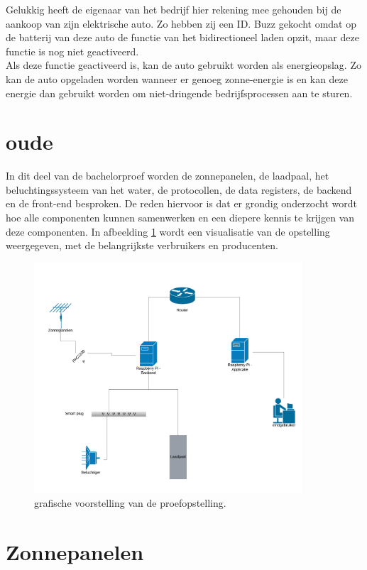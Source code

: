 Gelukkig heeft de eigenaar van het bedrijf hier rekening mee gehouden bij de aankoop van zijn elektrische auto. Zo hebben zij een ID. Buzz gekocht omdat op de batterij van deze auto de functie van het bidirectioneel laden opzit, maar deze functie is nog niet geactiveerd.\\

Als deze functie geactiveerd is, kan de auto gebruikt worden als energieopslag. Zo kan de auto opgeladen worden wanneer er genoeg zonne-energie is en kan deze energie dan gebruikt worden om niet-dringende bedrijfsprocessen aan te sturen.

\section{oude}
\label{sec:stand-van-zaken-oude}

In dit deel van de bachelorproef worden de zonnepanelen, de laadpaal, het beluchtingssysteem van het water, de protocollen, de data registers, de backend en de front-end besproken. De reden hiervoor is dat er grondig onderzocht wordt hoe alle componenten kunnen samenwerken en een diepere kennis te krijgen van deze componenten. In afbeelding \ref{fig:Netwedrkdiagram-Opstelling} wordt een visualisatie van de opstelling weergegeven, met de belangrijkste verbruikers en producenten.

\begin{figure}[h]
    \includegraphics[width=10cm]{./graphics/Netwerkdiagram-Opstelling.png}
    \caption{grafische voorstelling van de proefopstelling.}
    \label{fig:Netwedrkdiagram-Opstelling}
\end{figure}

\section{Zonnepanelen}
\label{sec:stand-van-zaken-zonnepanelen}

